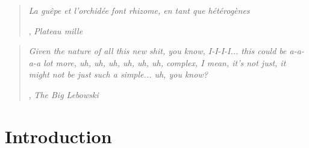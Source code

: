 \documentclass[]{article}
\begin{document}
{
\singlespacing
\small

\begin{quote}
\begin{flushright}
\textit{La guêpe et l'orchidée font rhizome, en tant que hétérogènes}\end{flushright}


\begin{flushright}
, \textit{Plateau mille} \end{flushright}

\end{quote}

\vspace{10mm}

\begin{quote}
    \begin{flushright}
    \textit{Given the nature of all this new shit, you know, I-I-I-I... this could be a-a-a-a lot more, uh, uh, uh, uh, uh, uh, complex, I mean, it's not just, it might not be just such a simple... uh, you know?} \end{flushright}

    \begin{flushright}
        , \textit{The Big Lebowski } 
    \end{flushright}
\end{quote}
}

\vspace{30mm}

{
\hypersetup{linkcolor=black}
\setcounter{tocdepth}{3}
\normalfont
\tableofcontents
}
\pagebreak



%
%

\hypertarget{introduction}{%
\section{Introduction}\label{introduction}}
\end{document}
